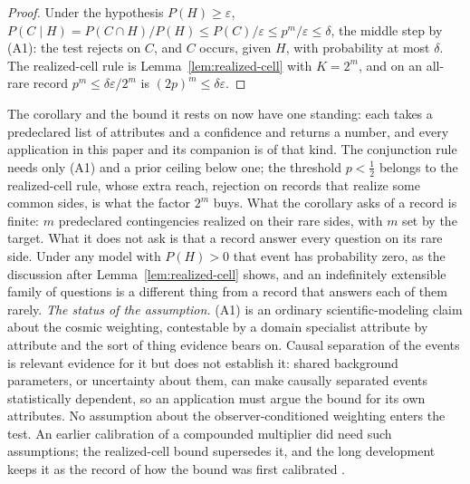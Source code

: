 \begin{proof} Under the hypothesis $P(H) \ge \varepsilon$, $P(C \mid H) = P(C \cap H)/P(H) \le P(C)/\varepsilon \le p^m/\varepsilon \le \delta$, the middle step by {\rm (A1)}: the test rejects on $C$, and $C$ occurs, given $H$, with probability at most $\delta$. The realized-cell rule is Lemma~\ref{lem:realized-cell} with $K = 2^m$, and on an all-rare record $p^m \le \delta\varepsilon/2^m$ is $(2p)^m \le \delta\varepsilon$. \end{proof}
\noindent The corollary and the bound it rests on now have one standing: each takes a predeclared list of attributes and a confidence and returns a number, and every application in this paper and its companion is of that kind. The conjunction rule needs only {\rm (A1)} and a prior ceiling below one; the threshold $p < \tfrac12$ belongs to the realized-cell rule, whose extra reach, rejection on records that realize some common sides, is what the factor $2^m$ buys. What the corollary asks of a record is finite: $m$ predeclared contingencies realized on their rare sides, with $m$ set by the target. What it does not ask is that a record answer every question on its rare side. Under any model with $P(H) > 0$ that event has probability zero, as the discussion after Lemma~\ref{lem:realized-cell} shows, and an indefinitely extensible family of questions is a different thing from a record that answers each of them rarely.
\noindent\textit{The status of the assumption.} {\rm (A1)} is an ordinary scientific-modeling claim about the cosmic weighting, contestable by a domain specialist attribute by attribute and the sort of thing evidence bears on. Causal separation of the events is relevant evidence for it but does not establish it: shared background parameters, or uncertainty about them, can make causally separated events statistically dependent, so an application must argue the bound for its own attributes. No assumption about the observer-conditioned weighting enters the test. An earlier calibration of a compounded multiplier did need such assumptions; the realized-cell bound supersedes it, and the long development keeps it as the record of how the bound was first calibrated \cite{Nexus}.

